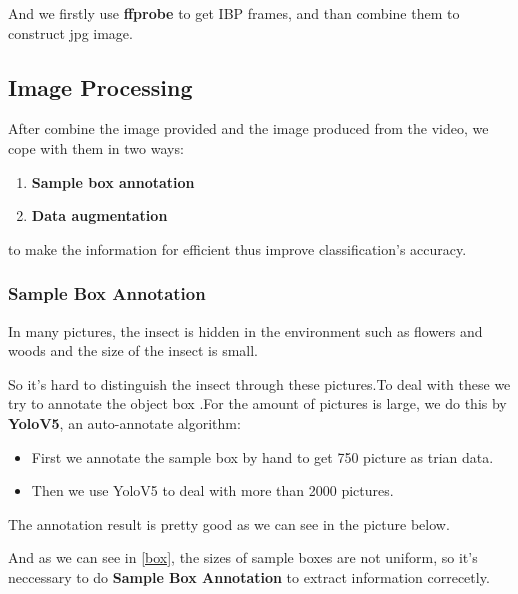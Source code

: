 \documentclass[12pt]{article}
\begin{document}
And we firstly use \textbf{ffprobe} to get IBP frames, and than combine them to construct jpg image.



\subsection{Image Processing}
After combine the image provided and the image produced from the video, we cope with them in two ways:
\begin{enumerate}
	\item \textbf{Sample box annotation} 
	\item \textbf{Data augmentation}
\end{enumerate}
to make the information for efficient thus improve classification's accuracy.


\subsubsection{Sample Box Annotation}
In many pictures, the insect is hidden in the environment such as flowers and woods and the size of the insect is small.

So it's hard to distinguish the insect through these pictures.To deal with these we try to annotate the object box .For the amount of pictures is large, we do this by  \textbf{YoloV5}\cite{Yolo}, an auto-annotate algorithm:
\begin{itemize}
	\item  First we annotate the sample box by hand to get 750 picture as trian data.
	\item  Then we use YoloV5 to deal with more than 2000 pictures.
\end{itemize}
The annotation result is pretty good as we can see in the picture below.

And as we can see in \ref{box}, the sizes of sample boxes are not uniform, so it's neccessary to do \textbf{Sample Box Annotation} to extract information correcetly.
\end{document}
